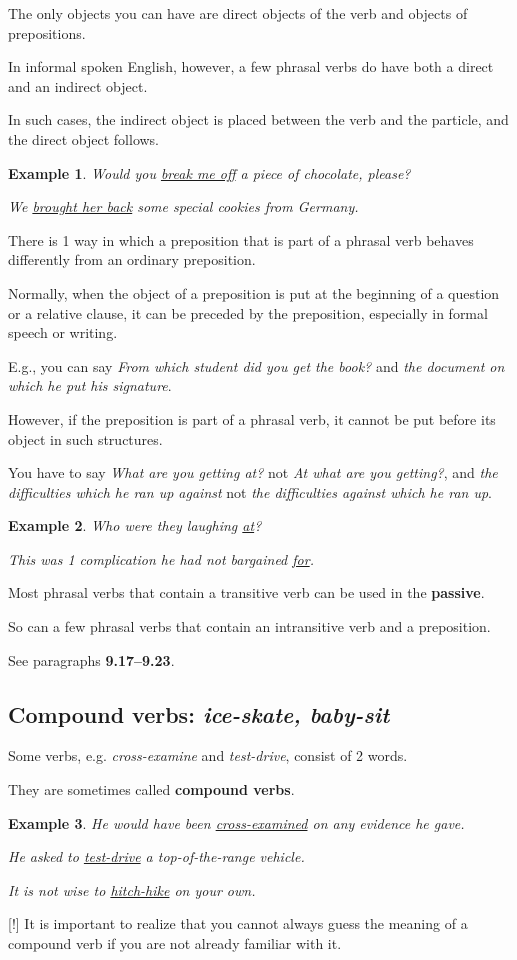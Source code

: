 \documentclass[oneside]{book}
\numberwithin{equation}{section}
\newtheorem{example}{Example}[section]
\begin{document}
The only objects you can have are direct objects of the verb and objects of prepositions.

In informal spoken English, however, a few phrasal verbs do have both a direct and an indirect object.

In such cases, the indirect object is placed between the verb and the particle, and the direct object follows.
\begin{example}
    Would you \underline{break me off} a piece of chocolate, please?
    
    We \underline{brought her back} some special cookies from Germany.
\end{example}
%
\noindent{} There is 1 way in which a preposition that is part of a phrasal verb behaves differently from an ordinary preposition.

%
Normally, when the object of a preposition is put at the beginning of a question or a relative clause, it can be preceded by the preposition, especially in formal speech or writing.

E.g., you can say \textit{From which student did you get the book?} and \textit{the document on which he put his signature}.

%
However, if the preposition is part of a phrasal verb, it cannot be put before its object in such structures.

You have to say \textit{What are you getting at?} not \textit{At what are you getting?}, and \textit{the difficulties which he ran up against} not \textit{the difficulties against which he ran up}.
\begin{example}
    Who were they laughing \underline{at}?
    
    This was 1 complication he had not bargained \underline{for}.
\end{example}
%
\noindent{} Most phrasal verbs that contain a transitive verb can be used in the \textbf{passive}.

So can a few phrasal verbs that contain an intransitive verb and a preposition.

See paragraphs \textbf{9.17--9.23}.

\subsection{Compound verbs: \textit{ice-skate, baby-sit}}
\noindent{} Some verbs, e.g. \textit{cross-examine} and \textit{test-drive}, consist of 2 words.

They are sometimes called \textbf{compound verbs}.
\begin{example}
    He would have been \underline{cross-examined} on any evidence he gave.
    
    He asked to \underline{test-drive} a top-of-the-range vehicle.
    
    It is not wise to \underline{hitch-hike} on your own.
\end{example}
%
\noindent{} [!] It is important to realize that you cannot always guess the meaning of a compound verb if you are not already familiar with it.
\end{document}
